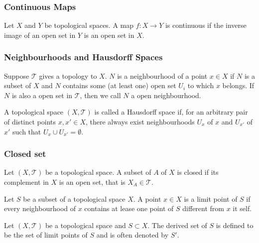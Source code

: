 \documentclass[10pt]{article}
\begin{document}
\subsubsection{Continuous Maps}
\begin{definition}
    Let $X$ and $Y$ be topological spaces.
    A map $f:X\to Y$ is continuous if the inverse image of an open set in $Y$ is an open set in $X$.
\end{definition}

\subsubsection{Neighbourhoods and Hausdorff Spaces}
\begin{definition}[Neighbourhood]
    Suppose $\mathcal{T}$ gives a topology to $X$.
    $N$ is a neighbourhood of a point $x\in X$ if $N$ is a subset of $X$ and $N$ contains some (at least one) open set $U_i$ to which $x$ belongs.
    If $N$ is also a open set in $\mathcal{T}$, then we call $N$ a open neighbourhood.
\end{definition}

\begin{definition}
    A topological space $(X,\mathcal{T})$ is called a Hausdorff space if, for an arbitrary pair of distinct points $x,x'\in X$, there always exist neighbourhoods $U_x$ of $x$ and $U_{x'}$ of $x'$ such that $U_x\cup U_{x'}=\emptyset$.
\end{definition}

\subsubsection{Closed set}
\begin{definition}
    Let $(X,\mathcal{T})$ be a topological space.
    A subset of $A$ of $X$ is closed if its complement in $X$ is an open set, that is $X_A\in\mathcal{T}$.
\end{definition}

\begin{definition}
    Let $S$ be a subset of a topological space $X$.
    A point $x\in X$ is a limit point of $S$ if every neighbourhood of $x$ contains at lease one point of $S$ different from $x$ it self.
\end{definition}

\begin{definition}
    Let $(X,\mathcal{T})$ be a topological space and $S\subset X$.
    The derived set of $S$ is defined to be the set of limit points of $S$ and is often denoted by $S'$.
\end{definition}
\end{document}
